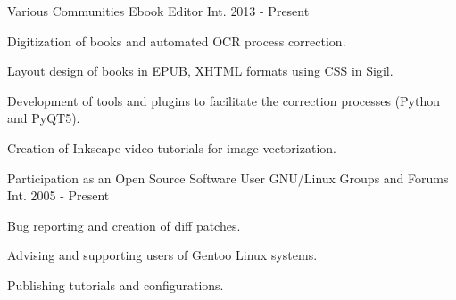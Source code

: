 


\begin{cventries}

  \cventry
    {Various Communities} %
    {Ebook Editor} %
    {Int.} %
    {2013 - Present} %
    {
      \begin{cvitems} %
        \item {Digitization of books and automated OCR process correction.}
        \item {Layout design of books in EPUB, XHTML formats using CSS in Sigil.}
        \item {Development of tools and plugins to facilitate the correction processes (Python and PyQT5).}
        \item {Creation of Inkscape video tutorials for image vectorization.}
      \end{cvitems}
    }

  \cventry
    {Participation as an Open Source Software User} %
    {GNU/Linux Groups and Forums} %
    {Int.} %
    {2005 - Present} %
    {
      \begin{cvitems} %
        \item {Bug reporting and creation of diff patches.}
        \item {Advising and supporting users of Gentoo Linux systems.}
        \item {Publishing tutorials and configurations.}
      \end{cvitems}
    }


\end{cventries}
